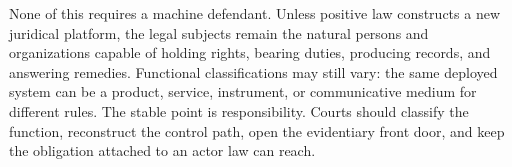 None of this requires a machine defendant. Unless positive law constructs a new juridical platform, the legal subjects remain the natural persons and organizations capable of holding rights, bearing duties, producing records, and answering remedies. Functional classifications may still vary: the same deployed system can be a product, service, instrument, or communicative medium for different rules. The stable point is responsibility. Courts should classify the function, reconstruct the control path, open the evidentiary front door, and keep the obligation attached to an actor law can reach.
